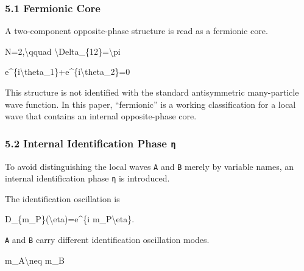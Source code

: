 \documentclass[
  a4paper,
]{article}
\newenvironment{Shaded}{}{}
\newcommand{\NormalTok}[1]{#1}
\begin{document}
\subsubsection{5.1 Fermionic Core}\label{fermionic-core}

A two-component opposite-phase structure is read as a fermionic core.

\begin{Shaded}
\begin{Highlighting}[]
\NormalTok{N=2,\textbackslash{}qquad \textbackslash{}Delta\_\{12\}=\textbackslash{}pi}
\end{Highlighting}
\end{Shaded}

\begin{Shaded}
\begin{Highlighting}[]
\NormalTok{e\^{}\{i\textbackslash{}theta\_1\}+e\^{}\{i\textbackslash{}theta\_2\}=0}
\end{Highlighting}
\end{Shaded}

This structure is not identified with the standard antisymmetric
many-particle wave function. In this paper, ``fermionic'' is a working
classification for a local wave that contains an internal opposite-phase
core.

\subsubsection{\texorpdfstring{5.2 Internal Identification Phase
\texttt{η}}{5.2 Internal Identification Phase η}}\label{internal-identification-phase-ux3b7}

To avoid distinguishing the local waves \texttt{A} and \texttt{B} merely
by variable names, an internal identification phase \texttt{η} is
introduced.

The identification oscillation is

\begin{Shaded}
\begin{Highlighting}[]
\NormalTok{D\_\{m\_P\}(\textbackslash{}eta)=e\^{}\{i m\_P\textbackslash{}eta\}.}
\end{Highlighting}
\end{Shaded}

\texttt{A} and \texttt{B} carry different identification oscillation
modes.

\begin{Shaded}
\begin{Highlighting}[]
\NormalTok{m\_A\textbackslash{}neq m\_B}
\end{Highlighting}
\end{Shaded}
\end{document}
